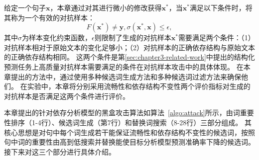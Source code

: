给定一个句子$\bm{x}$，本章通过对其进行微小的修改获得$\bm{x}^*$，当$\bm{x}^*$满足以下条件时，将其称为一个有效的对抗样本：
$$F(\bm{x}^*) \neq \bm{y}, \sigma(\bm{x}^*, \bm{x})\le \epsilon, $$
其中$\sigma$为样本变化约束函数，$\epsilon$则限制了生成的对抗样本$\bm{x}^*$需要满足两个条件：（1）对抗样本相对于原始文本的变化足够小；（2）对抗样本的正确依存结构与原始文本的正确依存结构相同。
这两个条件是第\ref{sec:chapter3-related-work}中提出的结构化预测任务上高质量对抗样本需要满足的条件在对抗样本攻击中的具体体现。
在本章提出的方法中，通过使用多种候选词生成方法和多种候选词过滤方法来确保他们。
在实验中，本章将分别采用流畅性和依存结构不变性两个评价指标对生成的对抗样本是否满足这两个条件进行评价。

本章提出的针对依存分析模型的黑盒攻击算法如算法~\ref{algo:attack}所示，由词重要性排序（1-4行）、候选词生成（第7行）和替换词搜索（8-28行）三部分组成。
其核心思想是对句中每个词生成若干能保证流畅性和依存结构不变性的候选词，按照句中词的重要性由高到低搜索并替换能使目标分析模型预测准确率下降的候选词。
接下来对这三个部分进行具体介绍。

